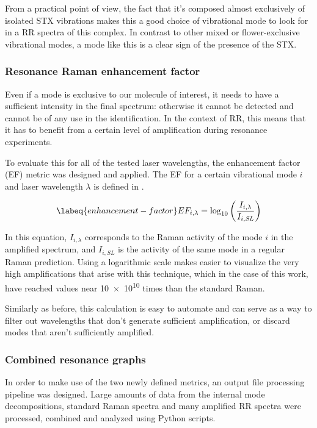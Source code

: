From a practical point of view, the fact that it's composed almost exclusively of isolated STX vibrations makes this a good choice of vibrational mode to look for in a RR spectra of this complex.
In contrast to other mixed or flower-exclusive vibrational modes, a mode like this is a clear sign of the presence of the STX.

\subsubsection{Resonance Raman enhancement factor}
Even if a mode is exclusive to our molecule of interest, it needs to have a sufficient intensity in the final spectrum: otherwise it cannot be detected and cannot be of any use in the identification.
In the context of RR, this means that it has to benefit from a certain level of amplification during resonance experiments.

To evaluate this for all of the tested laser wavelengths, the enhancement factor (EF) metric was designed and applied.
The EF for a certain vibrational mode $i$ and laser wavelength $\lambda$  is defined in .

\begin{equation}
    \labeq{enhancement-factor}
    EF_{i,\lambda} = \log_{10}\left(\frac{I_{i,\lambda}}{I_{i,\textit{SL}}}\right)
\end{equation}

In this equation, $I_{i,\lambda}$ corresponds to the Raman activity of the mode $i$ in the amplified spectrum, and $I_{i,\textit{SL}}$ is the activity of the same mode in a regular Raman prediction.
Using a logarithmic scale makes easier to visualize the very high amplifications that arise with this technique, which in the case of this work, have reached values near \num{10e10} times than the standard Raman.

Similarly as before, this calculation is easy to automate and can serve as a way to filter out wavelengths that don't generate sufficient amplification, or discard modes that aren't sufficiently amplified.

\subsubsection{Combined resonance graphs}
In order to make use of the two newly defined metrics, an output file processing pipeline was designed.
Large amounts of data from the internal mode decompositions, standard Raman spectra and many amplified RR spectra were processed, combined and analyzed using Python scripts.

